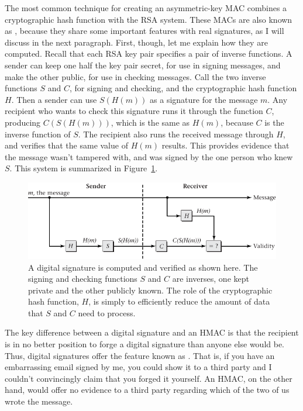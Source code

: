 The most common technique for creating an asymmetric-key MAC combines
a cryptographic hash function with the RSA system.  These MACs are
also known as , because they share some
important features with real signatures, as I will discuss in the next
paragraph.  First, though, let me explain how they are computed.
Recall that each RSA key pair specifies a pair of inverse functions.
A sender can keep one half the key pair secret, for use in signing
messages, and make the other public, for use in checking messages.
Call the two inverse functions $S$ and $C$, for signing and checking,
and the cryptographic hash function $H$.  Then a sender can use
$S(H(m))$ as a signature for the message $m$. Any recipient who wants to
check this signature runs it through the function $C$, producing
$C(S(H(m)))$, which is the same as $H(m)$, because $C$ is the inverse
function of $S$.  The recipient also runs the received message through
$H$, and verifies that the same value of $H(m)$ results.  This
provides evidence that the message wasn't tampered with, and was
signed by the one person who knew $S$.  This system is summarized in
Figure~\ref{scan-9-11}.
\begin{figure}
\centerline{\includegraphics{hail_f0913}}
\caption{A digital signature is computed and verified as shown here.  The signing and
checking functions $S$ and $C$ are inverses, one kept private and the
other publicly known.  The role of the cryptographic hash function,
$H$, is simply to efficiently reduce the amount of data that $S$ and
$C$ need to process.}
\label{scan-9-11}
\end{figure}

The key difference between a digital signature and an HMAC is that the
recipient is in no better position to forge a digital signature than
anyone else would be.  Thus, digital signatures offer the feature
known as .  That is, if you have an embarrassing
email signed by me, you could show it to a third party and I couldn't
convincingly claim that you forged it yourself.  An HMAC, on the other
hand, would offer no evidence to a third party regarding which of the
two of us wrote the message.

